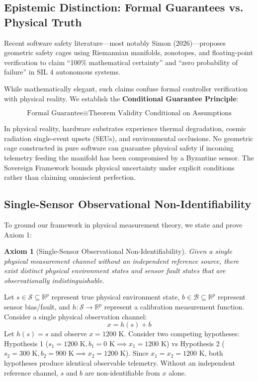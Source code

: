 \documentclass[conference]{IEEEtran}
\begin{document}
\subsection{Epistemic Distinction: Formal Guarantees vs. Physical Truth}
Recent software safety literature---most notably Simon (2026)---proposes geometric safety cages using Riemannian manifolds, zonotopes, and floating-point verification to claim ``100\% mathematical certainty'' and ``zero probability of failure'' in SIL 4 autonomous systems.

While mathematically elegant, such claims confuse formal controller verification with physical reality. We establish the \textbf{Conditional Guarantee Principle}:

\begin{equation}
\boxed{\text{Formal Guarantee} \equiv \text{Theorem Validity Conditional on Assumptions}}
\end{equation}

In physical reality, hardware substrates experience thermal degradation, cosmic radiation single-event upsets (SEUs), and environmental occlusions. No geometric cage constructed in pure software can guarantee physical safety if incoming telemetry feeding the manifold has been compromised by a Byzantine sensor. The Sovereign Framework bounds physical uncertainty under explicit conditions rather than claiming omniscient perfection.

\subsection{Single-Sensor Observational Non-Identifiability}
To ground our framework in physical measurement theory, we state and prove Axiom 1:

\newtheorem{axiom}{Axiom}
\begin{axiom}[Single-Sensor Observational Non-Identifiability]
Given a single physical measurement channel without an independent reference source, there exist distinct physical environment states and sensor fault states that are observationally indistinguishable.
\end{axiom}

\begin{IEEEproof}
Let $s \in \mathcal{S} \subseteq \mathbb{R}^p$ represent true physical environment state, $b \in \mathcal{B} \subseteq \mathbb{R}^p$ represent sensor bias/fault, and $h: \mathcal{S} \to \mathbb{R}^p$ represent a calibration measurement function. Consider a single physical observation channel:
\begin{equation}
x = h(s) + b
\end{equation}
Let $h(s) = s$ and observe $x = 1200\text{ K}$. Consider two competing hypotheses: Hypothesis 1 ($s_1 = 1200\text{ K}, b_1 = 0\text{ K} \implies x_1 = 1200\text{ K}$) vs Hypothesis 2 ($s_2 = 300\text{ K}, b_2 = 900\text{ K} \implies x_2 = 1200\text{ K}$). Since $x_1 = x_2 = 1200\text{ K}$, both hypotheses produce identical observable telemetry. Without an independent reference channel, $s$ and $b$ are non-identifiable from $x$ alone.
\end{IEEEproof}
\end{document}
